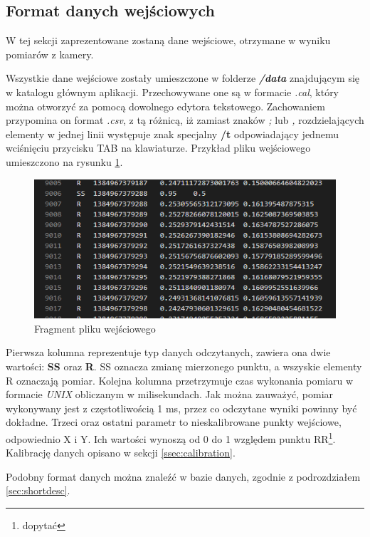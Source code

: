 \subsection{Format danych wejściowych}
\label{ssec:importdata}
W tej sekcji zaprezentowane zostaną dane wejściowe, otrzymane w wyniku pomiarów z kamery.\par
Wszystkie dane wejściowe zostały umieszczone w folderze \emph{\textbf{/data}} znajdującym się w katalogu głównym aplikacji. Przechowywane one są w formacie \emph{.cal}, który można otworzyć za pomocą dowolnego edytora tekstowego. Zachowaniem przypomina on format \emph{.csv}, z tą różnicą, iż zamiast znaków \emph{;} lub \emph{,} rozdzielających elementy w jednej linii występuje znak specjalny \textbf{/t} odpowiadający jednemu wciśnięciu przycisku TAB na klawiaturze. Przykład pliku wejściowego umieszczono na rysunku \ref{fig:plikwejsciowy}.
\begin{figure}[H]
        \centering
        \captionsetup{justification=centering,margin=2cm}
        \includegraphics[width=0.8\linewidth]{resources/plikwejsciowy.png}
        \caption{Fragment pliku wejściowego}
        \label{fig:plikwejsciowy}
\end{figure}
Pierwsza kolumna reprezentuje typ danych odczytanych, zawiera ona dwie wartości: \textbf{SS} oraz \textbf{R}. SS oznacza zmianę mierzonego punktu, a wszyskie elementy R oznaczają pomiar. Kolejna kolumna przetrzymuje czas wykonania pomiaru w formacie \emph{UNIX} obliczanym w milisekundach. Jak można zauważyć, pomiar wykonywany jest z częstotliwością 1 ms, przez co odczytane wyniki powinny być dokładne. Trzeci oraz ostatni parametr to nieskalibrowane punkty wejściowe, odpowiednio X i Y. Ich wartości wynoszą od 0 do 1 względem punktu RR\footnote{dopytać}. Kalibrację danych opisano w sekcji \ref{ssec:calibration}.\par
Podobny format danych można znaleźć w bazie danych, zgodnie z podrozdziałem \ref{sec:shortdesc}.\par
